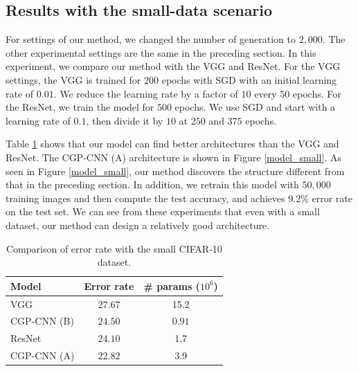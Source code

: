 \subsection{Results with the small-data scenario}
For settings of our method, we changed the number of generation to $2,000$.
The other experimental settings are the same in the preceding section.
In this experiment, we compare our method with the VGG and ResNet.
For the VGG settings, the VGG is trained for $200$ epochs with SGD with an initial learning rate of $0.01$.
We reduce the learning rate by a factor of $10$ every $50$ epochs.
For the ResNet, we train the model for $500$ epochs.
We use SGD and start with a learning rate of $0.1$, then divide it by $10$ at $250$ and $375$ epochs.

Table \ref{results_small} shows that our model can find better architectures than the VGG and ResNet.
The CGP-CNN (A) architecture is shown in Figure \ref{model_small}.
As seen in Figure \ref{model_small}, our method discovers the structure different from that in the preceding section.
In addition, we retrain this model with $50,000$ training images and then compute the test accuracy, and achieves $9.2\%$ error rate on the test set.
We can see from these experiments that even with a small dataset, our method can design a relatively good architecture.


\begin{table}[t]
  \caption{Comparison of error rate with the small CIFAR-10 dataset.}
  \label{results_small}
  \begin{tabular}{l|c|c} \hline
    Model & Error rate & \# params ($10^6$) \\ \hline
   VGG \cite{simonyan_very_2014} & $27.67$ & 15.2 \\
   CGP-CNN (B) & $24.50$ & $0.91$ \\ 
   ResNet \cite{he_deep_2016} & $24.10$ & 1.7 \\ 
   CGP-CNN (A) & $22.82$  & $3.9$  \\ \hline
  \end{tabular}
\end{table}

